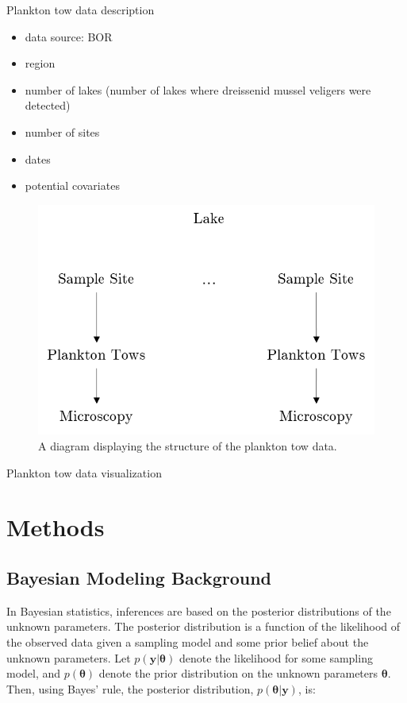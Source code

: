 \documentclass[12pt]{article}\usepackage[]{graphicx}\usepackage[]{color}
\begin{document}
Plankton tow data description
\begin{itemize}
  \item data source: BOR
  \item region
  \item number of lakes (number of lakes where dreissenid mussel veligers were detected)
  \item number of sites
  \item dates
  \item potential covariates
\end{itemize}

\begin{figure}[]
	\centering
	\includegraphics[scale = 0.7]{planktontow}
	\caption{A diagram displaying the structure of the plankton tow data.}
	\label{fig:tow_diagram}
\end{figure}

Plankton tow data visualization

\section{Methods}

\subsection{Bayesian Modeling Background}

In Bayesian statistics, inferences are based on the posterior distributions of the unknown parameters. The posterior distribution is a function of the likelihood of the observed data given a sampling model and some prior belief about the unknown parameters. Let $p(\bm{y}|\bm{\theta})$ denote the likelihood for some sampling model, and $p(\bm{\theta})$ denote the prior distribution on the unknown parameters $\bm{\theta}$. Then, using Bayes' rule, the posterior distribution, $p(\bm{\theta}|\bm{y})$, is: 
\end{document}
